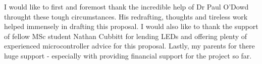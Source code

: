 \documentclass{sigchi}
\begin{document}
I would like to first and foremost thank the incredible help of Dr Paul O'Dowd throught these tough circumstances. His redrafting, thoughts and tireless work helped immensely in drafting this proposal. I would also like to thank the support of fellow MSc student Nathan Cubbitt for lending LEDs and offering plenty of experienced microcontroller advice for this proposal. Lastly, my parents for there huge support - especially with providing financial support for the project so far. 

\balance{}



\end{document}
